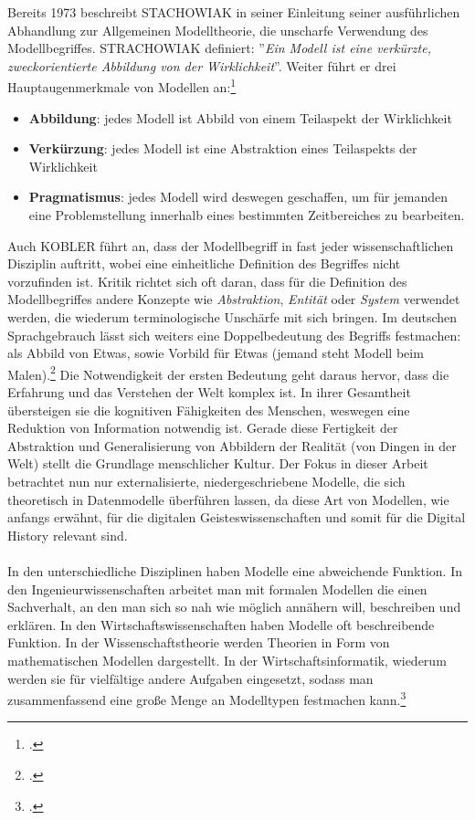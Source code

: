\documentclass[12pt,a4paper]{article}
\begin{document}
Bereits 1973 beschreibt STACHOWIAK in seiner Einleitung seiner ausführlichen Abhandlung zur Allgemeinen Modelltheorie, die unscharfe Verwendung des Modellbegriffes. STRACHOWIAK definiert: ''\textit{Ein Modell ist eine verkürzte, zweckorientierte Abbildung von der Wirklichkeit}''. Weiter führt er drei Hauptaugenmerkmale von Modellen an:\footcite[][S.131–133]{stachowiak1973allgemeine}
\begin{itemize}
\item \textbf{Abbildung}: jedes Modell ist Abbild von einem Teilaspekt der Wirklichkeit
\item \textbf{Verkürzung}: jedes Modell ist eine Abstraktion eines Teilaspekts der Wirklichkeit
\item \textbf{Pragmatismus}: jedes Modell wird deswegen geschaffen, um für jemanden eine Problemstellung innerhalb eines bestimmten Zeitbereiches zu bearbeiten.
\end{itemize}
Auch KOBLER führt an, dass der Modellbegriff in fast jeder wissenschaftlichen Disziplin auftritt, wobei eine einheitliche Definition des Begriffes nicht vorzufinden ist. Kritik richtet sich oft daran, dass für die Definition des Modellbegriffes andere Konzepte wie \textit{Abstraktion}, \textit{Entität} oder \textit{System} verwendet werden, die wiederum terminologische Unschärfe mit sich bringen. Im deutschen Sprachgebrauch lässt sich weiters eine Doppelbedeutung des Begriffs festmachen: als Abbild von Etwas, sowie Vorbild für Etwas (jemand steht Modell beim Malen).\footcite[][S.129]{stachowiak1973allgemeine} Die Notwendigkeit der ersten Bedeutung geht daraus hervor, dass die Erfahrung und das Verstehen der Welt komplex ist. In ihrer Gesamtheit übersteigen sie die kognitiven Fähigkeiten des Menschen, weswegen eine Reduktion von Information notwendig ist. Gerade diese Fertigkeit der Abstraktion und Generalisierung von Abbildern der Realität (von Dingen in der Welt) stellt die Grundlage menschlicher Kultur. Der Fokus in dieser Arbeit betrachtet nun nur externalisierte, niedergeschriebene Modelle, die sich theoretisch in Datenmodelle überführen lassen, da diese Art von Modellen, wie anfangs erwähnt, für die digitalen Geisteswissenschaften und somit für die Digital History relevant sind.
\\
\\
In den unterschiedliche Disziplinen haben Modelle eine abweichende Funktion. In den Ingenieurwissenschaften arbeitet man mit formalen Modellen die einen Sachverhalt, an den man sich so nah wie möglich annähern will, beschreiben und erklären. In den Wirtschaftswissenschaften haben Modelle oft beschreibende Funktion. In der Wissenschaftstheorie werden Theorien in Form von mathematischen Modellen dargestellt. In der Wirtschaftsinformatik, wiederum werden sie für vielfältige andere Aufgaben eingesetzt, sodass man zusammenfassend eine große Menge an Modelltypen festmachen kann.\footcite[][S.41-44]{kobler2010qualitat}
\end{document}
